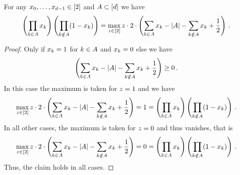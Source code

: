 \begin{lemma}
    \label{lem:monomialToQUBO}
    For any ${x_{0},\ldots,x_{d-1}}\in[2]$ and $A\subset[d]$ we have
    \[ \left( \prod_{\atomenumerator\in\variableset} \atomlegindexof{\atomenumerator } \right)  \left(  \prod_{\atomenumerator\notin\variableset} (1- \atomlegindexof{\atomenumerator }) \right)
    =
    \max_{\slackvariable\in[2]} \slackvariable \cdot 2 \cdot \left( \sum_{\atomenumerator\in\variableset}\atomlegindexof{\atomenumerator}  - \cardof{\variableset} - \sum_{\atomenumerator\notin\variableset}\atomlegindexof{\atomenumerator} + \frac{1}{2} \right) \, . %
    \]
\end{lemma}
\begin{proof} %
    Only if $x_{k}=1$ for $k\in A$ and $x_{k}=0$ else we have
    \[ \left( \sum_{k\in A}x_{k}  - \left|A\right| - \sum_{k\notin A}x_{k} + \frac{1}{2} \right) \geq 0 \, . \]
    In this case the maximum is taken for $z=1$ and we have
    \[ \max_{z\in[2]} z \cdot 2 \cdot \left( \sum_{k\in A}x_{k}  - \left|A\right| - \sum_{k\notin A}x_{k} + \frac{1}{2} \right)
    = 1 = \left( \prod_{k\in A} x_{k } \right)  \left(  \prod_{k\notin A} (1- x_{k }) \right) \, . \]
    In all other cases, the maximum is taken for $z=0$ and thus vanishes, that is
    \[ \max_{z\in[2]} z \cdot 2 \cdot \left( \sum_{k\in A}x_{k}  - \left|A\right| - \sum_{k\notin A}x_{k} + \frac{1}{2} \right)
    = 0 = \left( \prod_{k\in A} x_{k } \right)  \left(  \prod_{k\notin A} (1- x_{k }) \right) \, . \]
    Thus, the claim holds in all cases.
\end{proof}






